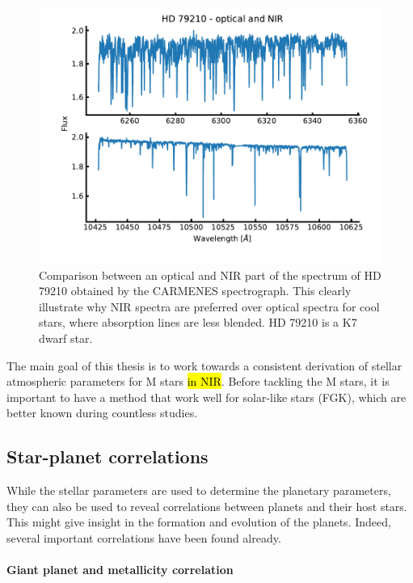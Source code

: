 \begin{figure}[htpb!]
    \centering
    \includegraphics[width=1.0\linewidth]{figures/opticalVSnir.pdf}
    \caption{Comparison between an optical and NIR part of the spectrum of HD 79210 obtained by
             the CARMENES spectrograph. This clearly illustrate why NIR spectra are preferred over
             optical spectra for cool stars, where absorption lines are less blended. HD 79210 is a
             K7 dwarf star.}
    \label{fig:opticalVSnir}
\end{figure}

The main goal of this thesis is to work towards a consistent derivation of stellar atmospheric
parameters for M stars \hl{in NIR}. Before tackling the M stars, it is important to have a method
that work well for solar-like stars (FGK), which are better known during countless studies.

\subsection{Star-planet correlations}

While the stellar parameters are used to determine the planetary parameters, they can also be used
to reveal correlations between planets and their host stars. This might give insight in the
formation and evolution of the planets. Indeed, several important correlations have been found
already.

\paragraph{Giant planet and metallicity correlation}

